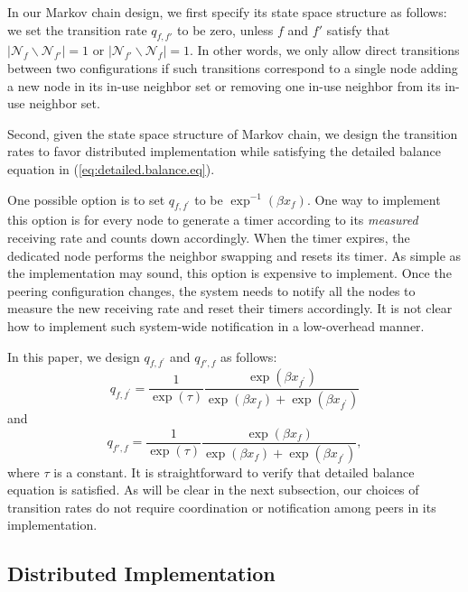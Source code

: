 \documentclass[10pt,conference]{IEEEtran}
\begin{document}
In our Markov chain design, we first specify its state space structure
as follows: we set the transition rate $q_{f,f'}$ to be zero, unless $f$ and $f'$ satisfy that
$|\mathcal{N}_{f}\backslash\mathcal{N}_{f'}|=1$ or $|\mathcal{N}_{f'}\backslash\mathcal{N}_{f}|=1$.
In other words, we only allow direct transitions between two configurations
if such transitions correspond to a single node adding a new node in its in-use
neighbor set or removing one in-use neighbor from its in-use neighbor set.

Second, given the state space structure of Markov chain, we design
the transition rates to favor distributed implementation
while satisfying the detailed balance equation in (\ref{eq:detailed.balance.eq}).

One possible option is to set $q_{f,f^{'}}$ to be $\exp^{-1}(\beta x_{f})$.
One way to implement this option is for every node to generate a timer according to its
\emph{measured} receiving rate and counts down accordingly. When the
timer expires, the dedicated node performs the neighbor swapping and resets its timer. As
simple as the implementation may sound, this option is expensive to implement. Once
the peering configuration changes, the system needs to notify all
the nodes to measure the new receiving rate and reset their timers
accordingly. It is not clear how to implement such system-wide notification
in a low-overhead manner.

In this paper, we design $q_{f,f^{'}}$ and
$q_{f',f}$ as follows:
\begin{equation}
q_{f,f^{'}}=\frac{1}{\exp(\tau)}\frac{\exp(\beta x_{f^{'}})}{\exp(\beta x_{f})+\exp(\beta x_{f^{'}})}\label{eq:transition rate}
\end{equation}
and
\begin{equation}
q_{f',f}=\frac{1}{\exp(\tau)}\frac{\exp(\beta x_{f})}{\exp(\beta x_{f})+\exp(\beta x_{f^{'}})},
\end{equation}
where $\tau$ is a constant. It is straightforward to verify that
detailed balance equation is satisfied. As will be clear in the next subsection, our choices of transition rates
do not require coordination or notification among peers in its implementation.


\subsection{Distributed Implementation\label{sub:Distributed-Implementation}}
\end{document}
